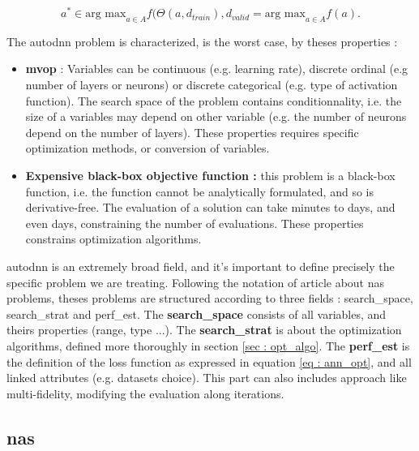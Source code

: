 \begin{equation}
    a^* \in \text{arg max}_{a\in A}f(\Theta (a, d_{train}), d_{valid}= \text{arg max}_{a \in A} f(a).
    \label{eq : autodnn_form}
\end{equation}

The \acrshort{autodnn} problem is characterized, is the worst case, by theses properties : 
\begin{itemize}
    \item \textbf{\acrfull{mvop}} : Variables can be continuous (e.g. learning rate), discrete ordinal (e.g number of layers or neurons) or discrete categorical (e.g. type of activation function). The search space of the problem contains conditionnality, i.e. the size of a variables may depend on other variable (e.g. the number of neurons depend on the number of layers). These properties requires specific optimization methods, or conversion of variables.
    \item \textbf{Expensive black-box objective function :} this problem is a black-box function, i.e. the function cannot be analytically formulated, and so is derivative-free. The evaluation of a solution can take minutes to days, and even days, constraining the number of evaluations. These properties constrains optimization algorithms.  
\end{itemize}

\acrshort{autodnn} is an extremely broad field, and it's important to define precisely the specific problem we are treating. Following the notation of article \cite{elsken_neural_2019} about \acrshort{nas} problems, theses problems are structured according to three fields : \Gls{search_space}, \Gls{search_strat} and \Gls{perf_est}. The \textbf{\gls{search_space}} consists of all variables, and theirs properties (range, type ...). The \textbf{\gls{search_strat}} is about the optimization algorithms, defined more thoroughly in section \ref{sec : opt_algo}. The \textbf{\gls{perf_est}} is the definition of the loss function as expressed in equation \ref{eq : ann_opt}, and all linked attributes (e.g. datasets choice). This part can also includes approach like multi-fidelity, modifying the evaluation along iterations.



\subsection{\acrfull{nas}}
\label{sec : nas}

